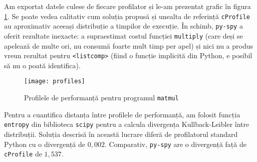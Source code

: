 Am exportat datele culese de fiecare profilator și le-am prezentat grafic în figura \ref{fig:performance_profiles}. Se poate vedea calitativ cum soluția propusă și unealta de referință \texttt{cProfile} au aproximativ aceeași distribuție a timpilor de execuție. În schimb, \texttt{py-spy} a oferit rezultate inexacte: a supraestimat costul funcției \texttt{multiply} (care deși se apelează de multe ori, nu consumă foarte mult timp per apel) și nici nu a produs vreun rezultat pentru \texttt{<listcomp>} (fiind o funcție implicită din Python, e posibil să nu o poată identifica).

\begin{figure}[htb]
    \centering
    \texttt{[image: profiles]}
    \caption{Profilele de performanță pentru programul \texttt{matmul}}
    \label{fig:performance_profiles}
\end{figure}

Pentru a cuantifica distanța între profilele de performanță, am folosit funcția \texttt{entropy} din biblioteca \texttt{scipy} \cite{scipy} pentru a calcula divergența Kullback-Leibler între distribuții. Soluția descrisă în această lucrare diferă de profilatorul standard Python cu o divergență de \(0,002\). Comparativ, \texttt{py-spy} are o divergență față de \texttt{cProfile} de \(1,537\).